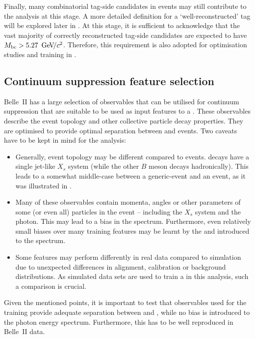 Finally, many combinatorial tag-side candidates in \BB events may still contribute to the analysis at this stage.
A more detailed definition for a `well-reconstructed' tag will be explored later in .
At this stage, it is sufficient to acknowledge that the vast majority of correctly reconstructed tag-side candidates are expected to have \mbox{${M_{\mathrm{bc}}}>5.27~{\mathrm{\,Ge\kern -0.1em V\!/}c^2}$}.
Therefore, this requirement is also adopted for optimisation studies and training in .

\subsection{Continuum suppression feature selection}\label{sec:continuum_features}

Belle~II has a large selection of observables that can be utilised for continuum suppression that are suitable to be used as input features to a \BDT.
These observables describe the event topology and other collective particle decay properties. 
They are optimised to provide optimal separation between \BB and \qqbar events.
Two caveats have to be kept in mind for the \BtoXsgamma analysis:
\begin{itemize}
    \item Generally, \BtoXsgamma event topology may be different compared to \BB events. 
    \BtoXsgamma decays have a single jet-like $X_s$ system (while the other $B$ meson decays hadronically).
    This leads to a somewhat middle-case between a generic-\BB event and an \epem\ra\qqbar event, as it was illustrated in .
    \item Many of these observables contain momenta, angles or other parameters of some (or even all) particles in the event -- including the $X_s$ system and the photon.
    This may lead to a bias in the \EB spectrum.
    Furthermore, even relatively small biases over many training features may be learnt by the \BDT and introduced to the spectrum.
    \item Some features may perform differently in real data compared to simulation due to unexpected differences in alignment, calibration or background distributions.
    As simulated data sets are used to train a \BDT in this analysis, such a comparison is crucial.
\end{itemize}
Given the mentioned points, it is important to test that observables used for the training provide adequate separation between \BtoXsgamma and \qqbar, while no bias is introduced to the photon energy spectrum.
Furthermore, this has to be well reproduced in Belle~II data.

